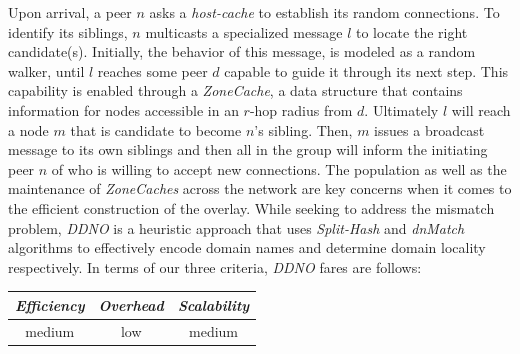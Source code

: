 Upon arrival, a peer $n$ asks a \emph{host-cache} to establish its
random connections. 
To identify its siblings, $n$ multicasts a specialized message $l$ 
to locate the right candidate(s).
Initially, the behavior of this message, is modeled as a random walker,
until $l$ reaches some peer $d$ capable to guide it through its next step.
This capability is enabled through a \emph{ZoneCache}, a data structure that
contains information for nodes accessible in an $r$-hop radius from $d$.
Ultimately $l$ will reach a node $m$ that is candidate to become $n$'s sibling. 
Then, $m$ issues a broadcast message to its own siblings and then all in the group will
inform the initiating peer $n$ of who is willing to accept new connections.
The population as well as the maintenance of \emph{ZoneCaches} across the network
are key concerns when it comes to the efficient construction of the overlay.
While seeking to address the mismatch problem, 
\emph{DDNO} is a heuristic approach that uses
\emph{Split-Hash} and \emph{dnMatch} algorithms to effectively encode domain
names and determine domain locality respectively. 
In terms of our three criteria, \emph{DDNO} fares are follows:
\begin{center}
{\footnotesize
\begin{tabular}{ccc}
\emph{Efficiency} & \emph{Overhead} & \emph{Scalability} \\
\hline
medium &
low &
medium
\end{tabular}
}
\end{center}

